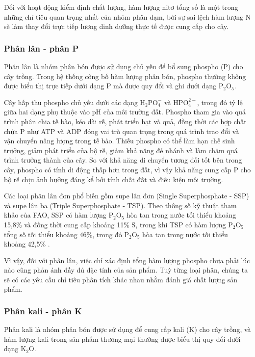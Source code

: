 Đối với hoạt động kiểm định chất lượng, hàm lượng nitơ tổng số là một trong những chỉ tiêu quan trọng nhất của nhóm phân đạm, bởi sự sai lệch hàm lượng N sẽ làm thay đổi trực tiếp lượng dinh dưỡng thực tế được cung cấp cho cây.

\subsubsection{Phân lân - phân P}
Phân lân là nhóm phân bón được sử dụng chủ yếu để bổ sung phospho (P) cho cây trồng. 
Trong hệ thống công bố hàm lượng phân bón, phospho thường không được biểu thị trực tiếp dưới dạng P mà được quy đổi và ghi dưới dạng \(\mathrm{P_2O_5}\).\cite{fao-fertilizer-specifications}

Cây hấp thu phospho chủ yếu dưới các dạng \(\mathrm{H_2PO_4^-}\) và \(\mathrm{HPO_4^{2-}}\), trong đó tỷ lệ giữa hai dạng phụ thuộc vào pH của môi trường đất.
Phospho tham gia vào quá trình phân chia tế bào, kéo dài rễ, phát triển hạt và quả, đồng thời các hợp chất chứa P như ATP và ADP đóng vai trò quan trọng trong quá trình trao đổi và vận chuyển năng lượng trong tế bào.
Thiếu phospho có thể làm hạn chế sinh trưởng, giảm phát triển của bộ rễ, giảm khả năng đẻ nhánh và làm chậm quá trình trưởng thành của cây. 
So với khả năng di chuyển tương đối tốt bên trong cây, phospho có tính di động thấp hơn trong đất, vì vậy khả năng cung cấp P cho bộ rễ chịu ảnh hưởng đáng kể bởi tính chất đất và điều kiện môi trường.

Các loại phân lân đơn phổ biến gồm supe lân đơn (Single Superphosphate - SSP) và supe lân ba (Triple Superphosphate - TSP). 
Theo thông số kỹ thuật tham khảo của FAO, SSP có hàm lượng \(\mathrm{P_2O_5}\) hòa tan trong nước tối thiểu khoảng 15,8\% và đồng thời cung cấp khoảng 11\% S, trong khi TSP có hàm lượng \(\mathrm{P_2O_5}\) tổng số tối thiểu khoảng 46\%, trong đó \(\mathrm{P_2O_5}\) hòa tan trong nước tối thiểu khoảng 42,5\% \cite{fao-fertilizer-specifications}.

Vì vậy, đối với phân lân, việc chỉ xác định tổng hàm lượng phospho chưa phải lúc nào cũng phản ánh đầy đủ đặc tính của sản phẩm. 
Tuỳ từng loại phân, chúng ta sẽ có các yêu cầu chỉ tiêu phân tích khác nhau nhằm đánh giá chất lượng sản phẩm. \cite{fao-fertilizer-specifications}

\subsubsection{Phân kali - phân K}
Phân kali là nhóm phân bón được sử dụng để cung cấp kali (K) cho cây trồng, và hàm lượng kali trong sản phẩm thương mại thường được biểu thị quy đổi dưới dạng \(\mathrm{K_2O}\).\cite{fao-fertilizer-specifications}

